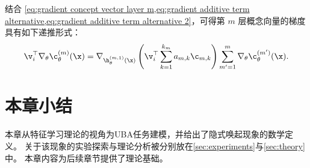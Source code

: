 结合 \cref{eq:gradient concept vector layer m,eq:gradient additive term alternative,eq:gradient additive term alternative 2}，可得第 $m$ 层概念向量的梯度具有如下递推形式：
\begin{equation}
    \v_i^{\top} \nabla_{\theta} \c^{(m)}_{\theta}(\x) = 
    \nabla_{\h_{\theta}^{(m,1)}(\x)} \left( \v_i^{\top} \sum_{k=1}^{k_m} a_{m,k} \c_{m,k} \right) 
    \sum_{m^{\prime}=1}^{m} \nabla_{\theta} \c^{(m^{\prime})}_{\theta}(\x).
\end{equation}

\section{本章小结}\label{sec:conclusion}
本章从特征学习理论的视角为UBA任务建模，并给出了隐式唤起现象的数学定义。
关于该现象的实验探索与理论分析被分别放在\cref{sec:experiments}与\cref{sec:theory}中。
本章内容为后续章节提供了理论基础。